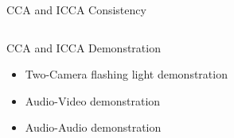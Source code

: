\documentclass[8pt]{beamer}
\begin{document}
\begin{frame}{CCA and ICCA Consistency}
\begin{columns}[T]
\begin{column}{1\textwidth}
  \end{column}
  \end{columns}



\end{frame}



\begin{frame}{CCA and ICCA Demonstration}

  \begin{itemize}
  \item Two-Camera flashing light demonstration
  \item Audio-Video demonstration
  \item Audio-Audio demonstration
  \end{itemize}

\end{frame}
\end{document}
